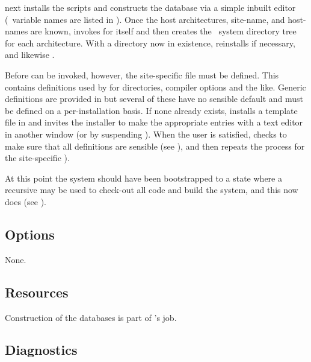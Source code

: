  next installs the  scripts and constructs the
 database via a simple inbuilt editor
(\aipspp\ variable names are listed in ).  Once the host
architectures, site-name, and host-names are known,  invokes
 for itself and then creates the \aipspp\ system directory
tree for each architecture.  With a  directory now in existence,
 reinstalls  if necessary, and likewise
.

Before  can be invoked, however, the site-specific
 file must be defined.  This contains definitions used by
 for directories, compiler options and the like.  Generic
definitions are provided in  but several of these
have no sensible default and must be defined on a per-installation basis.  If
none already exists,  installs a template 
file in  and invites the installer to make the appropriate
entries with a text editor in another window (or by suspending
).  When the user is satisfied,  checks to make
sure that all definitions are sensible (see ), and then
repeats the process for the site-specific ).

At this point the system should have been bootstrapped to a state where a
recursive  may be used to check-out all code and build the
system, and this  now does (see ).

\subsection*{Options}

None.

\subsection*{Resources}

Construction of the  databases is part of 's job.

\subsection*{Diagnostics}

